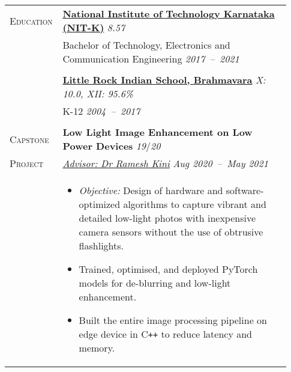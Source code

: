 \documentclass[letterpaper, 10pt, oneside]{article}
\newcommand{\stitle}[1]{\normalsize{\textsc{#1}}}
\newcommand{\bdit}[1]{{\textbf{#1}}}
\begin{document}
\begin{longtable}{@{} p{0.13\linewidth} p{0.8\linewidth}}
    \stitle{Education}   & \textbf{\href{https://nitk.ac.in}{National Institute of Technology Karnataka (NIT-K)}} \hfill \textsl{8.57}                                                                                                                   \\
                         & Bachelor of Technology, Electronics and Communication Engineering \hfill \hspace{-3em} \textsl{2017\ --\ 2021}                                                                                                                \\
    \\[-1.8ex]
                         & \textbf{\href{https://littlerock.edu.in}{Little Rock Indian School, Brahmavara}} \hfill \textsl{X: 10.0, XII: 95.6\%}                                                                                                         \\
                         & K-12 \hfill \textsl{2004\ --\ 2017}                                                                                                                                                                                           \\
    \\

    \stitle{Capstone}    & \bdit{Low Light Image Enhancement on Low Power Devices} \hfill \textsl{19}/\textsl{20}                                                                                                                                        \\
    \stitle{Project}     & \textsl{\href{https://ece.nitk.ac.in/faculty/ramesh-kini-m}{Advisor: Dr Ramesh Kini}} \hfill \textsl{Aug 2020\ --\ May 2021}                                                                                                  \\
                         & \parbox{0.8\textwidth}{                                                                                                                                                                                                       %
        \begin{itemize}[leftmargin=*, itemsep=-0.70ex, topsep=-0.88ex]
            \item \textsl{Objective:} Design of hardware and software-optimized algorithms to capture vibrant and detailed low-light photos with inexpensive camera sensors without the use of obtrusive flashlights.
            \item Trained, optimised, and deployed PyTorch models for de-blurring and low-light enhancement.
            \item Built the entire image processing pipeline on edge device in C\texttt{++} to reduce latency and memory.
        \end{itemize}
    }
    \\
    \\



\end{longtable}
\end{document}
